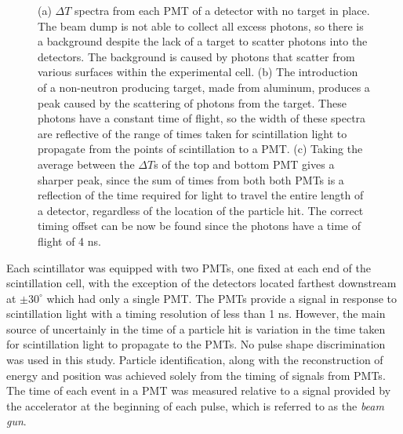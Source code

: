 \begin{figure}[htbp]
\caption{(a) $\Delta T$ spectra from each PMT of a detector with no target in place.
The beam dump is not able to collect all excess photons, so there is a background despite the lack of a target to scatter photons into the detectors.
The background is caused by photons that scatter from various surfaces within the experimental cell.
(b) The introduction of a non-neutron producing target, made from aluminum, produces a peak caused by the scattering of photons from the target.
These photons have a constant time of flight, so the width of these spectra are reflective of the range of times taken for scintillation light to propagate from the points of scintillation to a PMT.
(c) Taking the average between the $\Delta T$s of the top and bottom PMT gives a sharper peak, since the sum of times from both both PMTs is a reflection of the time required for light to travel the entire length of a detector, regardless of the location of the particle hit.
The correct timing offset can be now be found since the photons have a time of flight of 4 ns. }
\label{fig:ToFDetermination}
\end{figure}

Each scintillator was equipped with two PMTs, one fixed at each end of the scintillation cell, with the exception of the detectors located farthest downstream at $\pm30^{\circ}$ which had only a single PMT.
The PMTs provide a signal in response to scintillation light with a timing resolution of less than 1 ns.
However, the main source of uncertainly in the time of a particle hit is variation in the time taken for scintillation light to propagate to the PMTs. No pulse shape discrimination was used in this study.
Particle identification, along with the reconstruction of energy and position was achieved solely from the timing of signals from PMTs.
The time of each event in a PMT was measured relative to a signal provided by the accelerator at the beginning of each pulse, which is referred to as the \textit{beam gun}.

